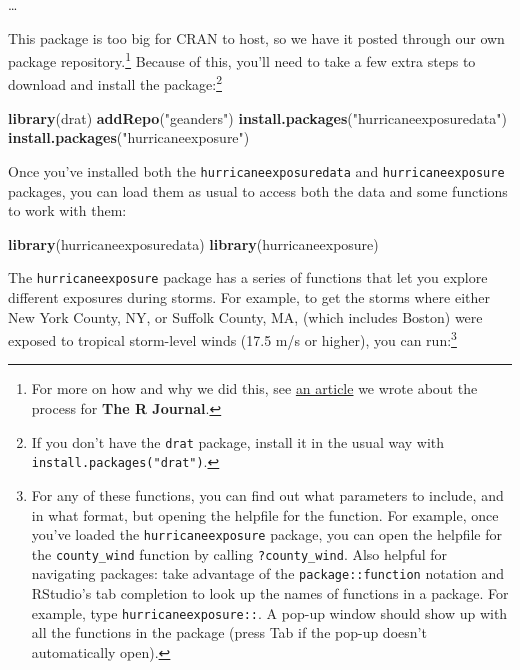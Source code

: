 \documentclass[]{tufte-book}
\newenvironment{Shaded}{}{}
\newcommand{\KeywordTok}[1]{\textcolor[rgb]{0.00,0.44,0.13}{\textbf{#1}}}
\newcommand{\NormalTok}[1]{#1}
\newcommand{\StringTok}[1]{\textcolor[rgb]{0.25,0.44,0.63}{#1}}
\begin{document}
\ldots{}

This package is too big for CRAN to host, so we have it posted through our own package
repository.\footnote{For more on how and why we did this, see
  \href{https://journal.r-project.org/archive/2017/RJ-2017-026/}{an article} we wrote about the
  process for \textbf{The R Journal}.} Because of this, you'll need to take a few extra steps
to download and install the package:\footnote{If you don't have the \texttt{drat} package, install it in
  the usual way with \texttt{install.packages("drat")}.}

\begin{Shaded}
\begin{Highlighting}[]
\KeywordTok{library}\NormalTok{(drat)}
\KeywordTok{addRepo}\NormalTok{(}\StringTok{"geanders"}\NormalTok{)}
\KeywordTok{install.packages}\NormalTok{(}\StringTok{"hurricaneexposuredata"}\NormalTok{)}
\KeywordTok{install.packages}\NormalTok{(}\StringTok{"hurricaneexposure"}\NormalTok{)}
\end{Highlighting}
\end{Shaded}

Once you've installed both the \texttt{hurricaneexposuredata} and \texttt{hurricaneexposure} packages, you
can load them as usual to access both the data and some functions to work with them:

\begin{Shaded}
\begin{Highlighting}[]
\KeywordTok{library}\NormalTok{(hurricaneexposuredata)}
\KeywordTok{library}\NormalTok{(hurricaneexposure)}
\end{Highlighting}
\end{Shaded}

The \texttt{hurricaneexposure} package has a series of functions that let you explore different
exposures during storms. For example, to get the storms where either New York County, NY,
or Suffolk County, MA, (which includes Boston) were exposed to tropical storm-level winds
(17.5 m/s or higher), you can run:\footnote{For any of these functions, you can find out what parameters
  to include, and in what format, but opening the helpfile for the function. For example, once you've
  loaded the \texttt{hurricaneexposure} package, you can open the helpfile for the \texttt{county\_wind} function
  by calling \texttt{?county\_wind}. Also helpful for navigating packages: take advantage of the \texttt{package::function}
  notation and RStudio's tab completion to look up the names of functions in a package. For example,
  type \texttt{hurricaneexposure::}. A pop-up window should show up with all the functions in the package (press
  Tab if the pop-up doesn't automatically open).}
\end{document}
